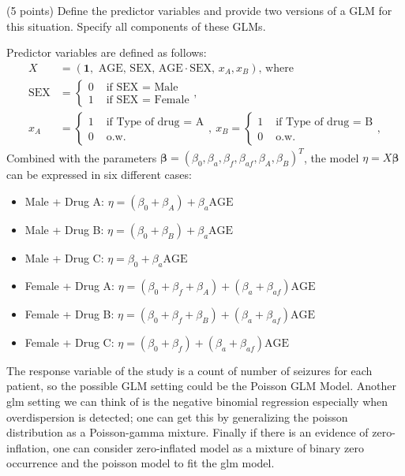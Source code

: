 \documentclass[11pt]{article}
\newcommand{\BE}{\bm{\beta}}
\newcommand{\0}{{\mathbf{0}}}
\newcommand{\1}{{\mathbf{1}}}
\newcommand{\pr}[1]{\noindent{\bf #1.}}
\newcommand{\so}{\noindent{\textsc{Solution.\;\;}}}
\begin{document}
\pr{1} (5 points) Define the predictor variables and provide two versions of a GLM for this situation. Specify all components of these GLMs.

\so
Predictor variables are defined as follows:
\begin{align*}
X &= (\mathbf{1}, \text{ AGE, SEX, AGE}\cdot \text{SEX, } x_A, x_B ) \text{, where} \\
\text{SEX} &= \begin{cases} 
0 & \text{ if  SEX = Male}\\ 
1 & \text{ if  SEX = Female}
\end{cases},\\ 
x_A &= \begin{cases} 
1 & \text{ if  Type of drug = A}\\ 
0 & \text{ o.w. }
\end{cases}, \ 
x_B = \begin{cases} 
1 & \text{ if  Type of drug = B}\\ 
0 & \text{ o.w. }
\end{cases},
\end{align*}
Combined with the parameters $\BE = (\beta_0, \beta_a, \beta_f, \beta_{af}, \beta_A, \beta_B)^T$, the model $\eta = X\BE$ can be expressed in six different cases:

\vspace{-.5cm}
\begin{itemize}
\setlength\itemsep{-0.5 em}
\item Male  +  Drug A: $\eta = (\beta_0 + \beta_A) + \beta_a  \text{AGE}$
\item Male  +  Drug B: $\eta = (\beta_0 + \beta_B) + \beta_a \text{AGE}$
\item Male  +  Drug C: $\eta = \beta_0 + \beta_a \text{AGE}$
\item Female + Drug A: $\eta = (\beta_0 + \beta_f + \beta_A) + (\beta_a + \beta_{af}) \text{AGE}$
\item Female + Drug B: $\eta = (\beta_0 + \beta_f + \beta_B) + (\beta_a + \beta_{af}) \text{AGE}$
\item Female + Drug C: $\eta = (\beta_0 + \beta_f) + (\beta_a + \beta_{af}) \text{AGE}$
\end{itemize}

The response variable of the study is a count of number of seizures for each patient, so the possible GLM setting could be the Poisson GLM Model. Another glm setting we can think of is the negative binomial regression especially when overdispersion is detected; one can get this by generalizing the poisson distribution as a Poisson-gamma mixture. Finally if there is an evidence of zero-inflation, one can consider zero-inflated model as a mixture of binary zero occurrence and the poisson model to fit the glm model. 
\end{document}
